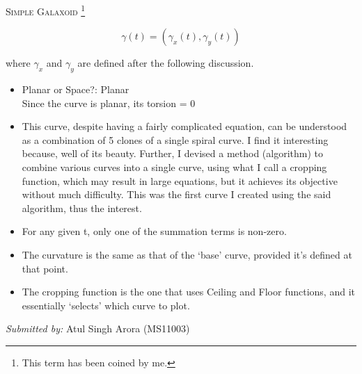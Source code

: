 \documentclass[a4paper,10pt]{article}
\begin{document}

\begin{center} 
\textsc{Simple Galaxoid} \footnote{This term has been coined by me.}
\end{center}

\begin{equation}
\gamma(t)=(\gamma_x(t),\gamma_y(t))
\end{equation}

where $\gamma_x$ and $\gamma_y$ are defined after the following discussion.

\begin{itemize}
\item Planar or Space?: Planar
\\
	Since the curve is planar, its torsion = 0 %
\item  This curve, despite having a fairly complicated equation, can be understood as a combination of 5 clones of a single spiral curve. I find it interesting because, well of its beauty. Further, I devised a method (algorithm) to combine various curves into a single curve, using what I call a cropping function, which may result in large equations, but it achieves its objective without much difficulty. This was the first curve I created using the said algorithm, thus the interest.

\item For any given t, only one of the summation terms is non-zero.
\item The curvature is the same as that of the `base' curve, provided it's defined at that point.
\item The cropping function is the one that uses Ceiling and Floor functions, and it essentially `selects' which curve to plot.
\end{itemize}
\vspace{30pt}
\hfill {\it Submitted by:} Atul Singh Arora (MS11003)
\end{document}
